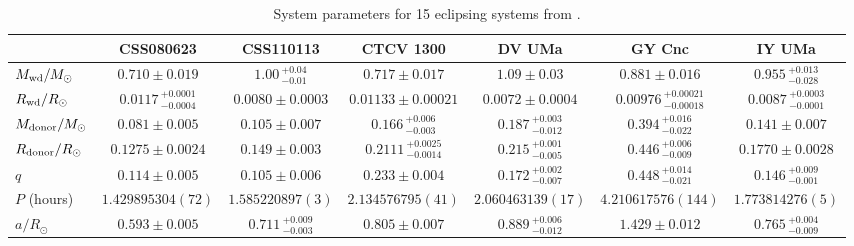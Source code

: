 \begin{landscape}
    \begin{table}
        \caption{System parameters for 15 eclipsing systems from \citet{McAllister2019}.}
        \label{table:mcallister system params}
        \begin{tabular}{lcccccc}
            \hline
            ~                           & \textbf{CSS080623}                & \textbf{CSS110113}        & \textbf{CTCV 1300}                & \textbf{DV UMa}               & \textbf{GY Cnc}                   & \textbf{IY UMa}                   \\
            \hline
            \hline
            $M_{\rm wd}/M_{\odot}$      & $0.710\pm0.019$                   & $1.00\,^{+0.04}_{-0.01}$  & $0.717\pm0.017$                   & $1.09\pm0.03$                 & $0.881\pm0.016$                   & $0.955\,^{+0.013}_{-0.028}$       \\
            $R_{\rm wd}/R_{\odot}$      & $0.0117\,^{+0.0001}_{-0.0004}$    & $0.0080\pm0.0003$         & $0.01133\pm0.00021$               & $0.0072\pm0.0004$             & $0.00976\,^{+0.00021}_{-0.00018}$ & $0.0087\,^{+0.0003}_{-0.0001}$    \\
            $M_{\rm donor}/M_{\odot}$   & $0.081\pm0.005$                   & $0.105\pm0.007$           & $0.166\,^{+0.006}_{-0.003}$       & $0.187\,^{+0.003}_{-0.012}$   & $0.394\,^{+0.016}_{-0.022}$       & $0.141\pm0.007$                   \\
            $R_{\rm donor}/R_{\odot}$   & $0.1275\pm0.0024$                 & $0.149\pm0.003$           & $0.2111\,^{+0.0025}_{-0.0014}$    & $0.215\,^{+0.001}_{-0.005}$   & $0.446\,^{+0.006}_{-0.009}$       & $0.1770\pm0.0028$                 \\
            $q$                         & $0.114\pm0.005$                   & $0.105\pm0.006$           & $0.233\pm0.004$                   & $0.172\,^{+0.002}_{-0.007}$   & $0.448\,^{+0.014}_{-0.021}$       & $0.146\,^{+0.009}_{-0.001}$       \\
            \hline
            $P$ (hours)                 & $1.429895304(72)$                 & $1.585220897(3)$          & $2.134576795(41)$                 & $2.060463139(17)$             & $4.210617576(144)$                & $1.773814276(5)$                  \\
            $a/R_{\odot}$               & $0.593\pm0.005$                   & $0.711\,^{+0.009}_{-0.003}$   & $0.805\pm0.007$               & $0.889\,^{+0.006}_{-0.012}$   & $1.429\pm0.012$                   & $0.765\,^{+0.004}_{-0.009}$       \\

\end{tabular}
\end{table}
\end{landscape}
